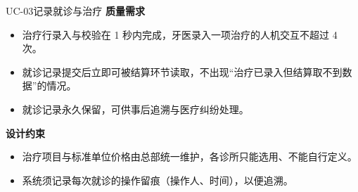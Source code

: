 \documentclass[11pt,a4paper]{ctexart}
\begin{document}
\begin{ucbox}{UC-03\quad 记录就诊与治疗}
\vspace{2pt}
\textbf{质量需求}
\begin{itemize}[leftmargin=1.4em,topsep=2pt,itemsep=1pt]
  \item 治疗行录入与校验在 1 秒内完成，牙医录入一项治疗的人机交互不超过 4 次。
  \item 就诊记录提交后立即可被结算环节读取，不出现“治疗已录入但结算取不到数据”的情况。
  \item 就诊记录永久保留，可供事后追溯与医疗纠纷处理。
\end{itemize}

\vspace{2pt}
\textbf{设计约束}
\begin{itemize}[leftmargin=1.4em,topsep=2pt,itemsep=1pt]
  \item 治疗项目与标准单位价格由总部统一维护，各诊所只能选用、不能自行定义。
  \item 系统须记录每次就诊的操作留痕（操作人、时间），以便追溯。
\end{itemize}
\end{ucbox}
\end{document}
